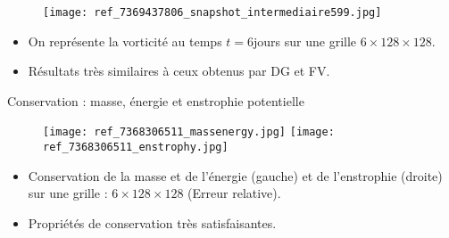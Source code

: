 \documentclass[11pt]{beamer}
\begin{document}

\begin{frame}{}
\begin{figure}
\texttt{[image: ref\_7369437806\_snapshot\_intermediaire599.jpg]}
\end{figure}
\begin{itemize}
\item On représente la vorticité au temps $t=6$jours sur une grille $6 \times 128 \times 128$.
\item Résultats très similaires à ceux obtenus par DG et FV.
\end{itemize}
\end{frame}


\begin{frame}{Conservation : masse, énergie et enstrophie potentielle}
\begin{figure}
\texttt{[image: ref\_7368306511\_massenergy.jpg]}
\texttt{[image: ref\_7368306511\_enstrophy.jpg]}
\end{figure}
\begin{itemize}
\item Conservation de la masse et de l'énergie (gauche) et de l'enstrophie (droite) sur une grille : $6 \times 128 \times 128$ (Erreur relative). 

\item Propriétés de conservation très satisfaisantes.
\end{itemize}
\end{frame}
\end{document}
